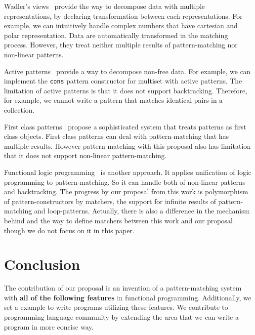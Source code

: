 \documentclass{article}
\begin{document}
Wadler's views~\cite{wadler1987views} provide the way to decompose data with multiple representations, by declaring transformation between each representations.
For example, we can intuitively handle complex numbers that have cartesian and polar representation.
Data are automatically transformed in the matching process.
However, they treat neither multiple results of pattern-matching nor non-linear patterns.

Active patterns~\cite{erwig1996active} provide a way to decompose non-free data.
For example, we can implement the \texttt{cons} pattern constructor for multiset with active patterns.
The limitation of active patterns is that it does not support backtracking.
Therefore, for example, we cannot write a pattern that matches identical pairs in a collection.

First class patterns~\cite{tullsen2000first} propose a sophisticated system that treats patterns as first class objects.
First class patterns can deal with pattern-matching that has multiple results.
However pattern-matching with this proposal also has limitation that it does not support non-linear pattern-matching.

Functional logic programming~\cite{AntoyHanus05LOPSTR} is another approach.
It applies unification of logic programming to pattern-matching.
So it can handle both of non-linear patterns and backtracking.
The progress by our proposal from this work is polymorphism of pattern-constructors by matchers, the support for infinite results of pattern-matching and loop-patterns.
Actually, there is also a difference in the mechanism behind and the way to define matchers between this work and our proposal though we do not focus on it in this paper.

\section{Conclusion}\label{conclusion}

The contribution of our proposal is an invention of a pattern-matching system with \textbf{all of the following features} in functional programming.
Additionally, we set a example to write programs utilizing these features.
We contribute to programming language community by extending the area that we can write a program in more concise way.
\end{document}
